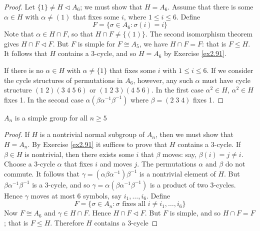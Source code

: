 \documentclass[11pt]{article}
\begin{document}
\begin{proof}
Let \(\{1\}\neq H\triangleleft A_6\); we must show that \(H=A_6\). Assume that there
is some \(\alpha\in H\) with \(\alpha\neq (1)\) that fixes some \(i\), where \(1\le
   i\le 6\). Define
\begin{equation*}
F=\{\sigma\in A_6:\sigma(i)=i\}
\end{equation*}
Note that \(\alpha\in H\cap F\), so that \(H\cap F\neq\{(1)\}\). The second
isomorphism theorem gives \(H\cap F\triangleleft F\). But \(F\) is simple for
\(F\cong A_5\), we have \(H\cap F=F\): that is \(F\le H\). It follows that \(H\)
contains a 3-cycle, and so \(H=A_6\) by Exercise \ref{ex2.91}.

If there is no \(\alpha\in H\) with \(\alpha\neq\{1\}\) that fixes some \(i\) with
\(1\le i\le 6\). If we consider the cycle structures of permutations in \(A_6\),
however, any such \(\alpha\) must have cycle structure \((1\;2)(3\;4\;5\;6)\) or
\((1\;2\;3)(4\;5\;6)\). In the first case \(\alpha^2\in H\), \(\alpha^2\in H\)
fixes 1. In the second case \(\alpha(\beta\alpha^{-1}\beta^{-1})\) where
\(\beta=(2\;3\;4)\) fixes 1.
\end{proof}

\begin{theorem}[]
\(A_n\) is a simple group for all \(n\ge 5\)
\end{theorem}

\begin{proof}
If \(H\) is a nontrivial normal subgroup of \(A_n\), then we must show that \(H=A_n\).
By Exercise \ref{ex2.91} it suffices to prove that \(H\) contains a 3-cycle. If
\(\beta\in H\) is nontrivial, then there exists some \(i\) that \(\beta\) moves: say,
\(\beta(i)=j\neq i\). Choose a 3-cycle \(\alpha\) that fixes \(i\) and moves \(j\). The
permutations \(\alpha\) and \(\beta\) do not commute. It follows that
\(\gamma=(\alpha\beta\alpha^{-1})\beta^{-1}\) is a nontrivial element of \(H\). But
\(\beta\alpha^{-1}\beta^{-1}\) is a 3-cycle, and so
\(\gamma=\alpha(\beta\alpha^{-1}\beta^{-1})\) is a product of two 3-cycles. Hence
\(\gamma\) moves at most 6 symbols, say \(i_1,\dots,i_6\). Define
\begin{equation*}
F=\{\sigma\in A_n:\sigma\text{ fixes all }i\neq i_1,\dots,i_6\}
\end{equation*}
Now \(F\cong A_6\) and \(\gamma\in H\cap F\). Hence \(H\cap F\triangleleft F\). But
\(F\) is simple, and so \(H\cap F=F\); that is \(F\le H\). Therefore \(H\) contains a
3-cycle 
\end{proof}
\end{document}
